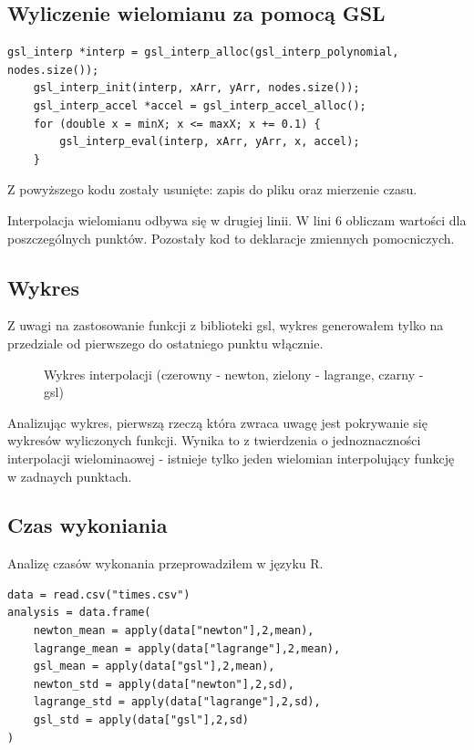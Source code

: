 \documentclass{article}
\begin{document}
    \subsection{Wyliczenie wielomianu za pomocą GSL}
    \lstset {language=C++}
    \begin{lstlisting}[caption={Interpolacja za pomocą GSL}]
    gsl_interp *interp = gsl_interp_alloc(gsl_interp_polynomial, nodes.size());
    gsl_interp_init(interp, xArr, yArr, nodes.size());
    gsl_interp_accel *accel = gsl_interp_accel_alloc();
    for (double x = minX; x <= maxX; x += 0.1) {
        gsl_interp_eval(interp, xArr, yArr, x, accel);
    }
    \end{lstlisting}

    Z powyższego kodu zostały usunięte: zapis do pliku oraz mierzenie czasu.

    Interpolacja wielomianu odbywa się w drugiej linii. W lini 6 obliczam wartości dla poszczególnych punktów.
    Pozostały kod to deklaracje zmiennych pomocniczych.

    \subsection{Wykres}
    Z uwagi na zastosowanie funkcji z biblioteki gsl, wykres generowałem tylko na przedziale od pierwszego do ostatniego punktu włącznie.
    \begin{figure}[h]
        \caption{\label{fig:allPoly} Wykres interpolacji (czerowny - newton, zielony - lagrange, czarny - gsl)}
    \end{figure}

    Analizując wykres, pierwszą rzeczą która zwraca uwagę jest pokrywanie się wykresów wyliczonych funkcji. 
    Wynika to z twierdzenia o jednoznaczności interpolacji wielominaowej - istnieje tylko jeden wielomian interpolujący funkcję w zadnaych punktach.

    \subsection{Czas wykoniania}
    Analizę czasów wykonania przeprowadziłem w języku R. 

    \lstset {language=R}
    \begin{lstlisting}[caption={Analiza czasów wykonań w R}]
data = read.csv("times.csv")
analysis = data.frame(
    newton_mean = apply(data["newton"],2,mean),
    lagrange_mean = apply(data["lagrange"],2,mean),
    gsl_mean = apply(data["gsl"],2,mean),
    newton_std = apply(data["newton"],2,sd),
    lagrange_std = apply(data["lagrange"],2,sd),
    gsl_std = apply(data["gsl"],2,sd)
)
    \end{lstlisting}
\end{document}

